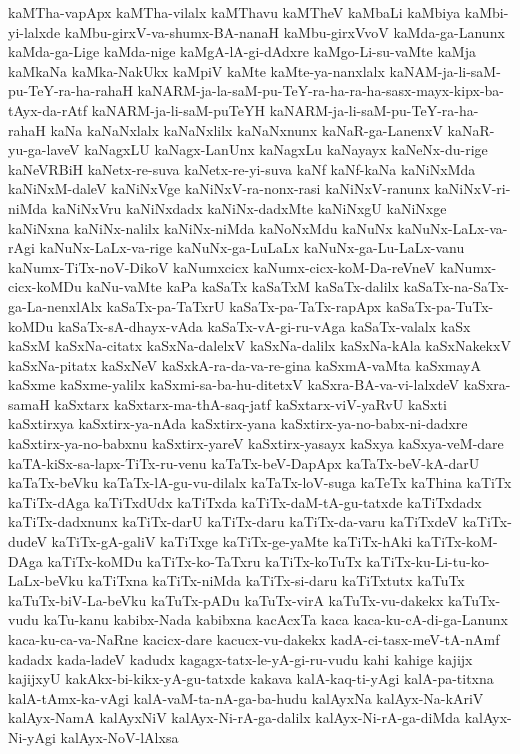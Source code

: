 {kaMTha-vapApx
kaMTha-vilalx
kaMThavu
kaMTheV
kaMbaLi
kaMbiya
kaMbi-yi-lalxde
kaMbu-girxV-va-shumx-BA-nanaH
kaMbu-girxVvoV
kaMda-ga-Lanunx
kaMda-ga-Lige
kaMda-nige
kaMgA-lA-gi-dAdxre
kaMgo-Li-su-vaMte
kaMja
kaMkaNa
kaMka-NakUkx
kaMpiV
kaMte
kaMte-ya-nanxlalx
kaNAM-ja-li-saM-pu-TeY-ra-ha-rahaH
kaNARM-ja-la-saM-pu-TeY-ra-ha-ra-ha-sasx-mayx-kipx-ba-tAyx-da-rAtf
kaNARM-ja-li-saM-puTeYH
kaNARM-ja-li-saM-pu-TeY-ra-ha-rahaH
kaNa
kaNaNxlalx
kaNaNxlilx
kaNaNxnunx
kaNaR-ga-LanenxV
kaNaR-yu-ga-laveV
kaNagxLU
kaNagx-LanUnx
kaNagxLu
kaNayayx
kaNeNx-du-rige
kaNeVRBiH
kaNetx-re-suva
kaNetx-re-yi-suva
kaNf
kaNf-kaNa
kaNiNxMda
kaNiNxM-daleV
kaNiNxVge
kaNiNxV-ra-nonx-rasi
kaNiNxV-ranunx
kaNiNxV-ri-niMda
kaNiNxVru
kaNiNxdadx
kaNiNx-dadxMte
kaNiNxgU
kaNiNxge
kaNiNxna
kaNiNx-nalilx
kaNiNx-niMda
kaNoNxMdu
kaNuNx
kaNuNx-LaLx-va-rAgi
kaNuNx-LaLx-va-rige
kaNuNx-ga-LuLaLx
kaNuNx-ga-Lu-LaLx-vanu
kaNumx-TiTx-noV-DikoV
kaNumxcicx
kaNumx-cicx-koM-Da-reVneV
kaNumx-cicx-koMDu
kaNu-vaMte
kaPa
kaSaTx
kaSaTxM
kaSaTx-dalilx
kaSaTx-na-SaTx-ga-La-nenxlAlx
kaSaTx-pa-TaTxrU
kaSaTx-pa-TaTx-rapApx
kaSaTx-pa-TuTx-koMDu
kaSaTx-sA-dhayx-vAda
kaSaTx-vA-gi-ru-vAga
kaSaTx-valalx
kaSx
kaSxM
kaSxNa-citatx
kaSxNa-dalelxV
kaSxNa-dalilx
kaSxNa-kAla
kaSxNakekxV
kaSxNa-pitatx
kaSxNeV
kaSxkA-ra-da-va-re-gina
kaSxmA-vaMta
kaSxmayA
kaSxme
kaSxme-yalilx
kaSxmi-sa-ba-hu-ditetxV
kaSxra-BA-va-vi-lalxdeV
kaSxra-samaH
kaSxtarx
kaSxtarx-ma-thA-saq-jatf
kaSxtarx-viV-yaRvU
kaSxti
kaSxtirxya
kaSxtirx-ya-nAda
kaSxtirx-yana
kaSxtirx-ya-no-babx-ni-dadxre
kaSxtirx-ya-no-babxnu
kaSxtirx-yareV
kaSxtirx-yasayx
kaSxya
kaSxya-veM-dare
kaTA-kiSx-sa-lapx-TiTx-ru-venu
kaTaTx-beV-DapApx
kaTaTx-beV-kA-darU
kaTaTx-beVku
kaTaTx-lA-gu-vu-dilalx
kaTaTx-loV-suga
kaTeTx
kaThina
kaTiTx
kaTiTx-dAga
kaTiTxdUdx
kaTiTxda
kaTiTx-daM-tA-gu-tatxde
kaTiTxdadx
kaTiTx-dadxnunx
kaTiTx-darU
kaTiTx-daru
kaTiTx-da-varu
kaTiTxdeV
kaTiTx-dudeV
kaTiTx-gA-galiV
kaTiTxge
kaTiTx-ge-yaMte
kaTiTx-hAki
kaTiTx-koM-DAga
kaTiTx-koMDu
kaTiTx-ko-TaTxru
kaTiTx-koTuTx
kaTiTx-ku-Li-tu-ko-LaLx-beVku
kaTiTxna
kaTiTx-niMda
kaTiTx-si-daru
kaTiTxtutx
kaTuTx
kaTuTx-biV-La-beVku
kaTuTx-pADu
kaTuTx-virA
kaTuTx-vu-dakekx
kaTuTx-vudu
kaTu-kanu
kabibx-Nada
kabibxna
kacAcxTa
kaca
kaca-ku-cA-di-ga-Lanunx
kaca-ku-ca-va-NaRne
kacicx-dare
kacucx-vu-dakekx
kadA-ci-tasx-meV-tA-nAmf
kadadx
kada-ladeV
kadudx
kagagx-tatx-le-yA-gi-ru-vudu
kahi
kahige
kajijx
kajijxyU
kakAkx-bi-kikx-yA-gu-tatxde
kakava
kalA-kaq-ti-yAgi
kalA-pa-titxna
kalA-tAmx-ka-vAgi
kalA-vaM-ta-nA-ga-ba-hudu
kalAyxNa
kalAyx-Na-kAriV
kalAyx-NamA
kalAyxNiV
kalAyx-Ni-rA-ga-dalilx
kalAyx-Ni-rA-ga-diMda
kalAyx-Ni-yAgi
kalAyx-NoV-lAlxsa
}
